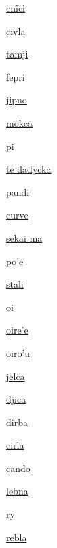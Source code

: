 {\hyperlink{val:cnici}{cnici}}{}{}{}

{\hyperlink{val:civla}{civla}}{}{}{}

{\hyperlink{val:tamji}{tamji}}{}{}{}

{\hyperlink{val:fepri}{fepri}}{}{}{}

{\hyperlink{val:jipno}{jipno}}{}{}{}

{\hyperlink{val:mokca}{mokca}}{}{}{}

{\hyperlink{val:pi}{pi}}{}{}{}

{\hyperlink{val:dadycka}{te dadycka}}{}{}{}

{\hyperlink{val:pandi}{pandi}}{}{}{}

{\hyperlink{val:curve}{curve}}{}{}{}

{\hyperlink{val:sekai ma}{sekai ma}}{}{}{}

{\hyperlink{val:pohe}{po'e}}{}{}{}

{\hyperlink{val:stali}{stali}}{}{}{}

{\hyperlink{val:oi}{oi}}{}{}{}

{\hyperlink{val:oirehe}{oire'e}}{}{}{}

{\hyperlink{val:oirohu}{oiro'u}}{}{}{}

{\hyperlink{val:jelca}{jelca}}{}{}{}

{\hyperlink{val:djica}{djica}}{}{}{}

{\hyperlink{val:dirba}{dirba}}{}{}{}

{\hyperlink{val:cirla}{cirla}}{}{}{}

{\hyperlink{val:cando}{cando}}{}{}{}

{\hyperlink{val:lebna}{lebna}}{}{}{}

{\hyperlink{val:ry}{ry}}{}{}{}

{\hyperlink{val:rebla}{rebla}}{}{}{}

